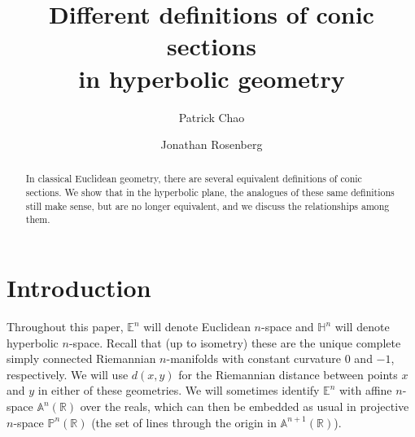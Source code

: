 \documentclass[12pt]{amsart}
\title[Conics in hyperbolic geometry]{Different definitions of conic
  sections\\ in hyperbolic geometry}
\author{Patrick Chao}
\author{Jonathan Rosenberg}
\theoremstyle{definition}
\begin{document}
\begin{abstract}
In classical Euclidean geometry, there are several equivalent
definitions of conic sections. We show that in the hyperbolic plane,
the analogues of these same definitions still make sense, but are no
longer equivalent, and we discuss the relationships among them.  
\end{abstract}

\maketitle

\section{Introduction}
\label{sec:intro}
Throughout this paper, ${\mathbb E}^n$ will denote Euclidean $n$-space and
${\mathbb H}^n$ will denote hyperbolic $n$-space. Recall that (up to isometry)
these are the unique complete simply connected
Riemannian $n$-manifolds with constant
curvature $0$ and $-1$, respectively. We will use $d(x,y)$ for the
Riemannian distance between points $x$ and $y$ in either of these
geometries. We will sometimes identify
${\mathbb E}^n$ with affine $n$-space ${\mathbb A}^n({\mathbb R})$ over the reals, which can
then be embedded as usual in projective $n$-space ${\mathbb P}^n({\mathbb R})$ (the
set of lines through the origin in ${\mathbb A}^{n+1}({\mathbb R})$).
\end{document}
